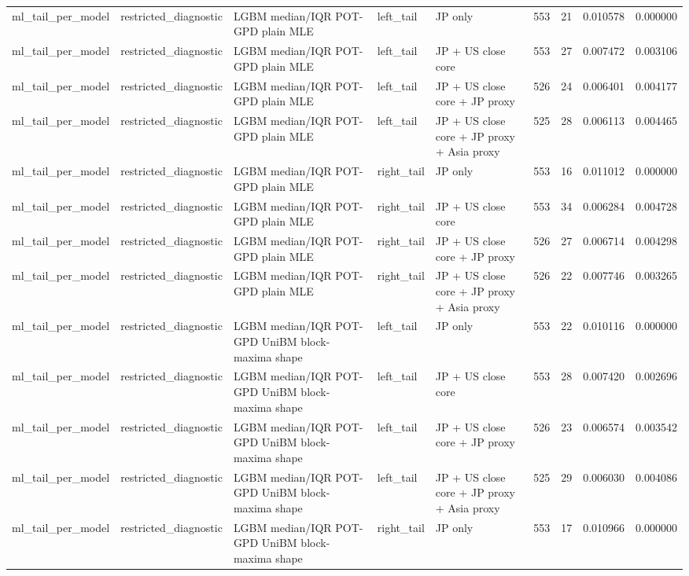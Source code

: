 \begin{tabular}{lllllrrrr}
ml\_tail\_per\_model & restricted\_diagnostic & LGBM median/IQR POT-GPD plain MLE & left\_tail & JP only & 553 & 21 & 0.010578 & 0.000000 \\
ml\_tail\_per\_model & restricted\_diagnostic & LGBM median/IQR POT-GPD plain MLE & left\_tail & JP + US close core & 553 & 27 & 0.007472 & 0.003106 \\
ml\_tail\_per\_model & restricted\_diagnostic & LGBM median/IQR POT-GPD plain MLE & left\_tail & JP + US close core + JP proxy & 526 & 24 & 0.006401 & 0.004177 \\
ml\_tail\_per\_model & restricted\_diagnostic & LGBM median/IQR POT-GPD plain MLE & left\_tail & JP + US close core + JP proxy + Asia proxy & 525 & 28 & 0.006113 & 0.004465 \\
ml\_tail\_per\_model & restricted\_diagnostic & LGBM median/IQR POT-GPD plain MLE & right\_tail & JP only & 553 & 16 & 0.011012 & 0.000000 \\
ml\_tail\_per\_model & restricted\_diagnostic & LGBM median/IQR POT-GPD plain MLE & right\_tail & JP + US close core & 553 & 34 & 0.006284 & 0.004728 \\
ml\_tail\_per\_model & restricted\_diagnostic & LGBM median/IQR POT-GPD plain MLE & right\_tail & JP + US close core + JP proxy & 526 & 27 & 0.006714 & 0.004298 \\
ml\_tail\_per\_model & restricted\_diagnostic & LGBM median/IQR POT-GPD plain MLE & right\_tail & JP + US close core + JP proxy + Asia proxy & 526 & 22 & 0.007746 & 0.003265 \\
ml\_tail\_per\_model & restricted\_diagnostic & LGBM median/IQR POT-GPD UniBM block-maxima shape & left\_tail & JP only & 553 & 22 & 0.010116 & 0.000000 \\
ml\_tail\_per\_model & restricted\_diagnostic & LGBM median/IQR POT-GPD UniBM block-maxima shape & left\_tail & JP + US close core & 553 & 28 & 0.007420 & 0.002696 \\
ml\_tail\_per\_model & restricted\_diagnostic & LGBM median/IQR POT-GPD UniBM block-maxima shape & left\_tail & JP + US close core + JP proxy & 526 & 23 & 0.006574 & 0.003542 \\
ml\_tail\_per\_model & restricted\_diagnostic & LGBM median/IQR POT-GPD UniBM block-maxima shape & left\_tail & JP + US close core + JP proxy + Asia proxy & 525 & 29 & 0.006030 & 0.004086 \\
ml\_tail\_per\_model & restricted\_diagnostic & LGBM median/IQR POT-GPD UniBM block-maxima shape & right\_tail & JP only & 553 & 17 & 0.010966 & 0.000000 \\

\end{tabular}

